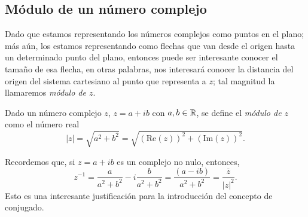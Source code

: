 \subsection{Módulo de un número complejo}

Dado que estamos representando los números complejos como puntos en el plano; más aún, los estamos representando como flechas que van desde el origen hasta un determinado punto del plano, entonces puede ser interesante conocer el tamaño de esa flecha, en otras palabras, nos interesará conocer la distancia del origen del sistema cartesiano al punto que representa a $z$; tal magnitud la llamaremos \emph{módulo de $z$}. 

\medskip

\begin{defn}
    Dado un n\'umero complejo $z$, $z = a+ib $ con $a,b \in \mathbb{R}$, 
	se define el {\em m\'odulo de $z$} como el n\'umero real
	$$|z| = \sqrt{a^2+b^2}=\sqrt{(\textrm{Re}(z))^2+(\textrm{Im}(z))^2}.$$
\end{defn}
Recordemos que, si $z= a+ib$ es un complejo no nulo, entonces,
\begin{equation}\label{moduloconj}
	z^{-1} = \frac{a}{a^2+b^2}-i\frac{b}{a^2+b^2} = \frac{\left(a-ib\right)}{a^2+b^2}= \frac{\overline{z}}{|z|^2}.
\end{equation}
Esto es una interesante justificación para la introducción del concepto de conjugado.

\medskip

